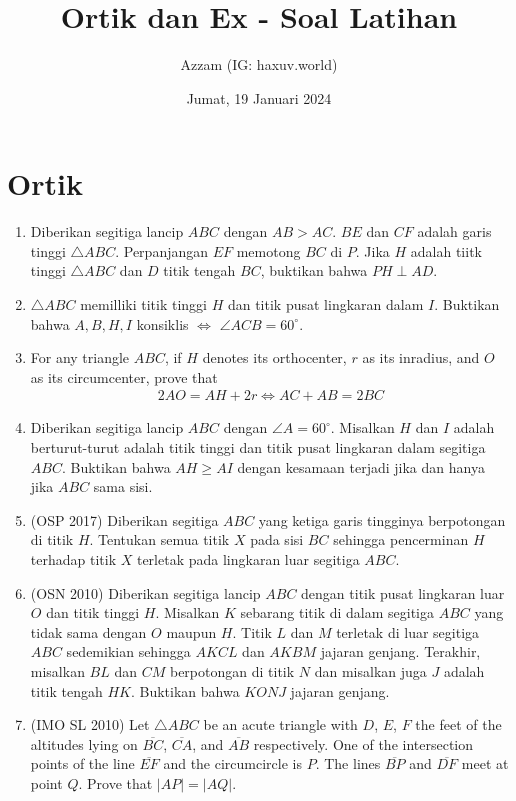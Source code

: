 \documentclass[11pt]{scrartcl}
\title{Ortik dan Ex - Soal Latihan}
\author{Azzam (IG: haxuv.world)}
\date{Jumat, 19 Januari 2024}
\begin{document}
\maketitle
\section{Ortik}
\begin{enumerate}
\item Diberikan segitiga lancip $ABC$ dengan $AB>AC$. $BE$ dan $CF$ adalah garis tinggi $\triangle ABC$. Perpanjangan $EF$ memotong $BC$ di $P$. Jika $H$ adalah tiitk tinggi $\triangle ABC$ dan $D$ titik tengah $BC$, buktikan bahwa $PH \perp AD$.

\item $\triangle ABC$ memilliki titik tinggi $H$ dan titik pusat lingkaran dalam $I$. Buktikan bahwa $A,B,H,I$ konsiklis $\iff$ $\angle ACB = 60^\circ$.

\item For any triangle $ABC$, if $H$ denotes its orthocenter, $r$ as its inradius, and $O$ as its circumcenter, prove that 
 \begin{align*}
     2AO = AH + 2r \iff AC+AB=2BC
 \end{align*}

\item Diberikan segitiga lancip $ABC$ dengan $\angle A = 60^\circ$. Misalkan $H$ dan $I$ adalah berturut-turut adalah titik tinggi dan titik pusat lingkaran dalam segitiga $ABC$. Buktikan bahwa $AH \ge AI$ dengan kesamaan terjadi jika dan hanya jika $ABC$ sama sisi.

\item (OSP 2017) Diberikan segitiga $ABC$ yang ketiga garis tingginya berpotongan di titik $H$. Tentukan semua titik $X$ pada sisi $BC$ sehingga pencerminan $H$ terhadap titik $X$ terletak pada lingkaran luar segitiga $ABC$.

\item (OSN 2010) Diberikan segitiga lancip $ABC$ dengan titik pusat lingkaran luar $O$ dan titik tinggi $H$. Misalkan $K$ sebarang titik di dalam segitiga $ABC$ yang tidak sama dengan $O$ maupun $H$. Titik $L$ dan $M$ terletak di luar segitiga $ABC$ sedemikian sehingga $AKCL$ dan $AKBM$ jajaran genjang. Terakhir, misalkan $BL$ dan $CM$ berpotongan di titik $N$ dan misalkan juga $J$ adalah titik tengah $HK$. Buktikan bahwa $KONJ$ jajaran genjang.

\item (IMO SL 2010) Let $\triangle ABC$ be an acute triangle with $D$, $E$, $F$ the feet of the altitudes lying on $\overline{BC}$, $\overline{CA}$, and $\overline{AB}$ respectively. One of the intersection points of the line $\overline{EF}$ and the circumcircle is $P$. The lines $\overline{BP}$ and $\overline{DF}$ meet at point $Q$. Prove that $|AP| = |AQ|$.


\end{enumerate}
\end{document}
